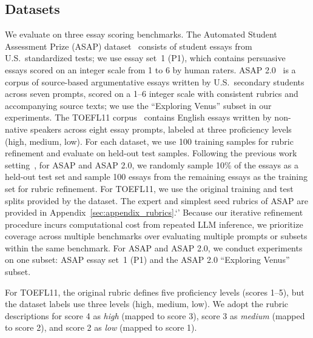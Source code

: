 \documentclass[11pt]{article}
\begin{document}
\subsection{Datasets}
We evaluate on three essay scoring benchmarks. The Automated Student Assessment Prize (ASAP) dataset~\citep{ben2012asap} consists of student essays from U.S.\ standardized tests; we use essay set~1 (P1), which contains persuasive essays scored on an integer scale from 1 to 6 by human raters. ASAP 2.0~\citep{Crossley2025ASAP2} is a corpus of source-based argumentative essays written by U.S.\ secondary students across seven prompts, scored on a 1--6 integer scale with consistent rubrics and accompanying source texts; we use the ``Exploring Venus'' subset in our experiments. The TOEFL11 corpus~\citep{blanchard2013toefl} contains English essays written by non-native speakers across eight essay prompts, labeled at three proficiency levels (high, medium, low). For each dataset, we use 100 training samples for rubric refinement and evaluate on held-out test samples. 
Following the previous work setting~\citep{lee-etal-2024-unleashing}, for ASAP and ASAP 2.0, we randomly sample 10\% of the essays as a held-out test set and sample 100 essays from the remaining essays as the training set for rubric refinement. For TOEFL11, we use the original training and test splits provided by the dataset.
The expert and simplest seed rubrics of ASAP are provided in Appendix~\ref{sec:appendix_rubrics}.`'
Because our iterative refinement procedure incurs computational cost from repeated LLM inference, we prioritize coverage across multiple benchmarks over evaluating multiple prompts or subsets within the same benchmark. For ASAP and ASAP 2.0, we conduct experiments on one subset: ASAP essay set~1 (P1) and the ASAP 2.0 ``Exploring Venus'' subset.

For TOEFL11, the original rubric defines five proficiency levels (scores 1--5), but the dataset labels use three levels (high, medium, low). We adopt the rubric descriptions for score 4 as \textit{high} (mapped to score 3), score 3 as \textit{medium} (mapped to score 2), and score 2 as \textit{low} (mapped to score 1). 
\end{document}
